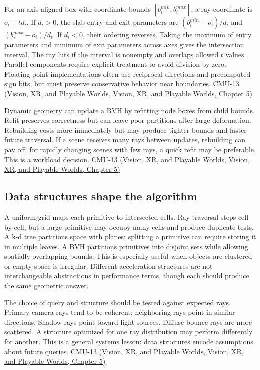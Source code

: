 For an axis-aligned box with coordinate bounds \([b_i^{min},b_i^{max}]\), a ray coordinate is \(o_i+td_i\). If \(d_i>0\), the slab-entry and exit parameters are \((b_i^{min}-o_i)/d_i\) and \((b_i^{max}-o_i)/d_i\). If \(d_i<0\), their ordering reverses. Taking the maximum of entry parameters and minimum of exit parameters across axes gives the intersection interval. The ray hits if the interval is nonempty and overlaps allowed \(t\) values. Parallel components require explicit treatment to avoid division by zero. Floating-point implementations often use reciprocal directions and precomputed sign bits, but must preserve conservative behavior near boundaries. \href{../07-Vision-XR-and-Playable-Worlds/main.pdf\#nameddest=04-visual-computing-ii-ch036-cmu-13---spatial-data-structures}{CMU-13 (Vision, XR, and Playable Worlds, Vision, XR, and Playable Worlds, Chapter 5)}

Dynamic geometry can update a BVH by refitting node boxes from child bounds. Refit preserves correctness but can leave poor partitions after large deformation. Rebuilding costs more immediately but may produce tighter bounds and faster future traversal. If a scene receives many rays between updates, rebuilding can pay off; for rapidly changing scenes with few rays, a quick refit may be preferable. This is a workload decision. \href{../07-Vision-XR-and-Playable-Worlds/main.pdf\#nameddest=04-visual-computing-ii-ch036-cmu-13---spatial-data-structures}{CMU-13 (Vision, XR, and Playable Worlds, Vision, XR, and Playable Worlds, Chapter 5)}

\subsection{Data structures shape the algorithm}\label{04-visual-computing-ii-ch029-data-structures-shape-the-algorithm}

A uniform grid maps each primitive to intersected cells. Ray traversal steps cell by cell, but a large primitive may occupy many cells and produce duplicate tests. A k-d tree partitions space with planes; splitting a primitive can require storing it in multiple leaves. A BVH partitions primitives into disjoint sets while allowing spatially overlapping bounds. This is especially useful when objects are clustered or empty space is irregular. Different acceleration structures are not interchangeable abstractions in performance terms, though each should produce the same geometric answer.

The choice of query and structure should be tested against expected rays. Primary camera rays tend to be coherent; neighboring rays point in similar directions. Shadow rays point toward light sources. Diffuse bounce rays are more scattered. A structure optimized for one ray distribution may perform differently for another. This is a general systems lesson: data structures encode assumptions about future queries. \href{../07-Vision-XR-and-Playable-Worlds/main.pdf\#nameddest=04-visual-computing-ii-ch036-cmu-13---spatial-data-structures}{CMU-13 (Vision, XR, and Playable Worlds, Vision, XR, and Playable Worlds, Chapter 5)}

